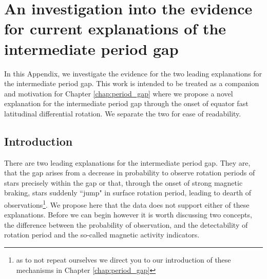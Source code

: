 \newcommand\apogee{\project{APOGEE}}


\chapter{An investigation into the evidence for current explanations of the intermediate period gap}
\label{apndx:magnetic}

In this Appendix, we investigate the evidence for the two leading explanations for the intermediate period gap.
This work is intended to be treated as a companion and motivation for Chapter \ref{chap:period_gap} where we propose a novel explanation for the intermediate period gap through the onset of equator fast latitudinal differential rotation.
We separate the two for ease of readability.

\section{Introduction}

There are two leading explanations for the intermediate period gap.
They are, that the gap arises from a decrease in probability to observe rotation periods of stars precisely within the gap or that, through the onset of strong magnetic braking, stars suddenly ``jump" in surface rotation period, leading to dearth of observations\footnote{as to not repeat ourselves we direct you to our introduction of these mechanisms in Chapter \ref{chap:period_gap}}.
We propose here that the data does not support either of these explanations.
Before we can begin however it is worth discussing two concepts, the difference between the probability of observation, and the detectability of rotation period and the so-called magnetic activity indicators.

